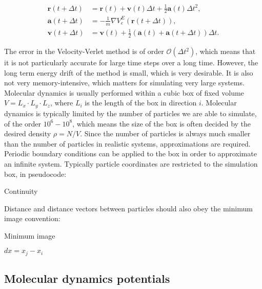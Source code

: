 \begin{equation}
    \begin{split}
        \bm{r}(t + \Delta t) 
        &= \bm{r}(t) + \bm{v}(t) \Delta t
        + \frac{1}{2} \bm{a}(t)\Delta t^2 , \\
        \bm{a}(t + \Delta t)
        &= -\frac{1}{m} \nabla V_e^E(\bm{r}(t + \Delta t)) , \\
        \bm{v}(t + \Delta t) 
        &= \bm{v}(t) + \frac{1}{2}
        (\bm{a}(t) + \bm{a}(t + \Delta t)) \Delta t .
    \end{split}
\end{equation}

The error in the Velocity-Verlet method is of order
$\mathcal{O}(\Delta t^2)$, which means that it is
not particularly accurate for large time steps
over a long time. However, the long term
energy drift of the method is small, which is very desirable.
It is also not very memory-intensive, which matters
for simulating very large systems.
\newline
\newline
Molecular dynamics is usually performed within
a cubic box of fixed volume $V = L_x \cdot L_y \cdot L_z$,
where $L_i$ is the length of the box in direction $i$.
Molecular dynamics is typically limited by the number
of particles we are able to simulate, of the order
$10^6 - 10^8$, which means the size of the box
is often decided by the desired density $\rho = N / V$.
Since the number of particles is always much smaller
than the number of particles in realistic systems,
approximations are required. Periodic boundary conditions
can be applied to the box in order to approximate
an infinite system. Typically particle coordinates are restricted
to the simulation box, in pseudocode:

\begin{algorithm}[H]
\caption{Continuity}
    \begin{algorithmic}
        \EndIf
        \EndIf
    \end{algorithmic}
\end{algorithm}

Distance and distance vectors between particles
should also obey the minimum image convention:

\begin{algorithm}[H]
\caption{Minimum image}
    \begin{algorithmic}
        \State $dx = x_j - x_i$
        \EndIf
        \EndIf
    \end{algorithmic}
\end{algorithm}




\subsection{Molecular dynamics potentials}
